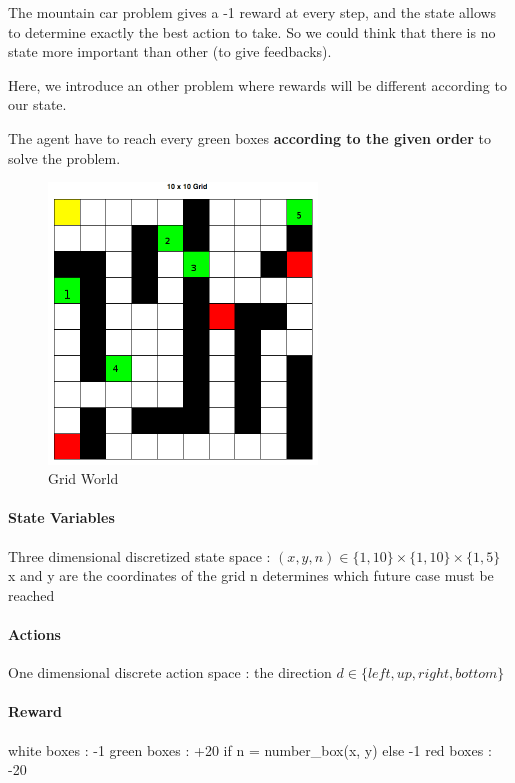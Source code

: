 \documentclass[a4paper,12pt]{article}
\begin{document}
The mountain car problem gives a -1 reward at every step, and the state allows to 
    determine exactly the best action to take. So we could think that there is no state more important than other (to give feedbacks). 

Here, we introduce an other problem where rewards will be different according to our state.
    
    The agent have to reach every green boxes \textbf{according to the given order} to solve the problem.
    

    \begin{figure}[H]
      \begin{center}
	\includegraphics[width=270px]{gridworld}
	\caption{ Grid World }
	\end{center}
    \end{figure}
    
    \paragraph{State Variables}
    Three dimensional discretized state space :\newline
    $(x,y,n) \in \{1, 10\} \times \{1, 10\} \times \{1, 5\}$ \newline
    x and y are the coordinates of the grid\newline
    n determines which future case must be reached
    
    \paragraph{Actions}
    One dimensional discrete action space : the direction \newline
    $d \in \{left, up, right, bottom\}$ 

     \paragraph{Reward} 
      white boxes : -1 \newline
      green boxes : +20 if n = number\_box(x, y) 
                    else -1 
      \newline
      red boxes : -20 
      
\end{document}
